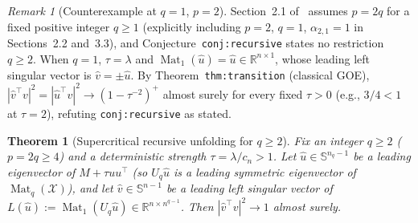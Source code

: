 \documentclass[11pt]{article}
\theoremstyle{plain}
\newtheorem{theorem}{Theorem}
\theoremstyle{definition}
\theoremstyle{remark}
\newtheorem{remark}{Remark}
\DeclareMathOperator{\Mat}{Mat}
\begin{document}
\begin{remark}[Counterexample at $q = 1$, $p = 2$]
Section~2.1 of~\cite{Szwagier2026} assumes $p = 2q$ for a fixed positive integer $q \ge 1$ (explicitly including $p = 2$, $q = 1$, $\alpha_{2,1} = 1$ in Sections~2.2 and~3.3), and Conjecture~\texttt{conj:recursive} states no restriction $q \ge 2$. When $q = 1$, $\tau = \lambda$ and $\Mat_1(\hat u) = \hat u \in \mathbb{R}^{n \times 1}$, whose leading left singular vector is $\hat v = \pm \hat u$. By Theorem~\texttt{thm:transition} (classical GOE), $|\hat v^\top v|^2 = |\hat u^\top v|^2 \to (1 - \tau^{-2})^+$ almost surely for every fixed $\tau > 0$ (e.g., $3/4 < 1$ at $\tau = 2$), refuting \texttt{conj:recursive} as stated.
\end{remark}

\begin{theorem}[Supercritical recursive unfolding for $q \ge 2$]\label{thm:recursive}
Fix an integer $q \ge 2$ ($p = 2q \ge 4$) and a deterministic strength $\tau = \lambda / c_n > 1$. Let $\hat u \in \mathbb{S}^{n_q - 1}$ be a leading eigenvector of $M + \tau u u^\top$ (so $U_q \hat u$ is a leading symmetric eigenvector of $\Mat_q(\mathcal{X})$), and let $\hat v \in \mathbb{S}^{n-1}$ be a leading left singular vector of $L(\hat u) := \Mat_1(U_q \hat u) \in \mathbb{R}^{n \times n^{q-1}}$. Then $|\hat v^\top v|^2 \to 1$ almost surely.
\end{theorem}
\end{document}
